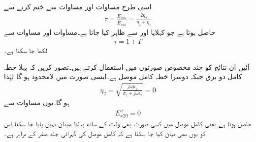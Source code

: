 اسی طرح مساوات  اور مساوات  سے  ختم کرنے سے
\begin{align}\label{مساوات_موج_شرح_ترسیل_تعریف}
\tau=\frac{E_{x20}^+}{E_{x10}^+ }=\frac{2\eta_2}{\eta_2+\eta_1}
\end{align}
حاصل ہوتا ہے جو   کہلایا اور  سے ظاہر کیا جاتا ہے۔مساوات  اور مساوات  سے
\begin{align}
\tau=1+\Gamma
\end{align}
لکھا جا سکتا ہے۔

آئیں ان نتائج کو چند مخصوص صورتوں میں استعمال کرتے ہیں۔تصور کریں کہ پہلا خطہ کامل ذو برق جبکہ دوسرا خطہ کامل موصل ہے۔ایسی صورت میں  لامحدود ہو گا لہٰذا
\begin{align*}
\eta_2=\sqrt{\frac{j \omega \mu_2}{\sigma_2+j\omega \epsilon_2}}=0
\end{align*} 
ہو گا۔یوں مساوات  سے 
\begin{align*}
E_{x20}^+=0
\end{align*}
حاصل ہوتا ہے یعنی کامل موصل میں کسی صورت بھی وقت کے ساتھ بدلتا میدان نہیں پایا جا سکتا۔اس کو یوں بھی بیان کیا جا سکتا ہے کہ کامل موصل کی گہرائی جلد صفر کے برابر ہے۔

